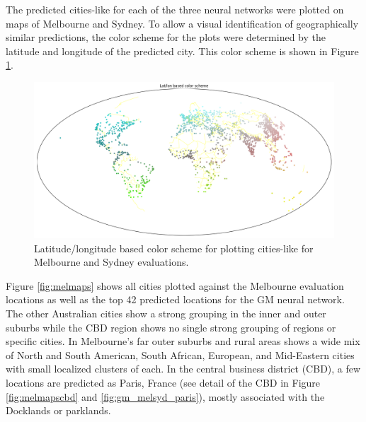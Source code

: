 \documentclass[sageh,times]{sagej}
\begin{document}
The predicted cities-like for each of the three neural networks were plotted on maps of Melbourne and Sydney. To allow a visual identification of geographically similar predictions, the color scheme for the plots were determined by the latitude and longitude of the predicted city. This color scheme is shown in Figure \ref{fig:colorscheme}. 


\begin{figure}[!htbp]
\centering    
\includegraphics[scale=0.25]{Images/World_map_color_scheme.png} 
\caption{Latitude/longitude based color scheme for plotting cities-like for Melbourne and Sydney evaluations.}    
 \label{fig:colorscheme}  
\end{figure} 


Figure \ref{fig:melmaps} shows all cities plotted against the Melbourne evaluation locations as well as the top 42 predicted locations for the GM neural network. The other Australian cities show a strong grouping in the inner and outer suburbs while the CBD region shows no single strong grouping of regions or specific cities. In Melbourne's far outer suburbs and rural areas shows a wide mix of North and South American, South African, European, and Mid-Eastern cities with small localized clusters of each. In the central business district (CBD), a few locations are predicted as Paris, France (see detail of the CBD in Figure \ref{fig:melmapscbd} and \ref{fig:gm_melsyd_paris}), mostly associated with the Docklands or parklands.
\end{document}
